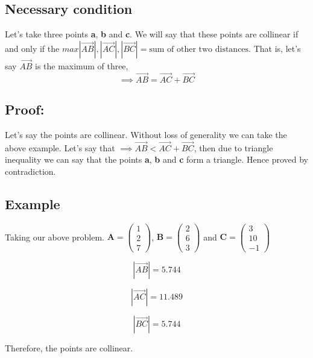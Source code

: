 \documentclass[journal,12pt,twocolumn]{IEEEtran}
\begin{document}
\subsection{Necessary condition}
Let's take three points \textbf{a}, \textbf{b} and \textbf{c}. We will say that these points are collinear if and only if the $max{|\overrightarrow{AB}|, |\overrightarrow{AC}|, |\overrightarrow{BC}|} = 
\text{sum of other two distances}$. That is, let's say $\overrightarrow{AB}$ is the maximum of three, 
$$\implies \overrightarrow{AB} = \overrightarrow{AC} + \overrightarrow{BC}$$
\subsection{Proof:}
Let's say the points are collinear.
Without loss of generality we can take the above example. Let's say that $\implies \overrightarrow{AB} < \overrightarrow{AC} + \overrightarrow{BC}$, then due to triangle inequality we can say that 
the points \textbf{a}, \textbf{b} and \textbf{c} form a triangle. Hence proved by contradiction.

\subsection{Example}
Taking our above problem.
 $\textbf{A} = \begin{pmatrix} 1 \\ 2 \\ 7 \end{pmatrix}$, $\textbf{B} = \begin{pmatrix} 2 \\ 6 \\ 3 
\end{pmatrix}$ and $\textbf{C} = \begin{pmatrix} 3 \\ 10 \\ -1 \end{pmatrix}$

\begin{equation}
    |\overrightarrow{AB}| = 5.744
\end{equation}

\begin{equation}
    |\overrightarrow{AC}| = 11.489
\end{equation}

\begin{equation}
    |\overrightarrow{BC}| = 5.744
\end{equation}

Therefore, the points are collinear.
\end{document}
